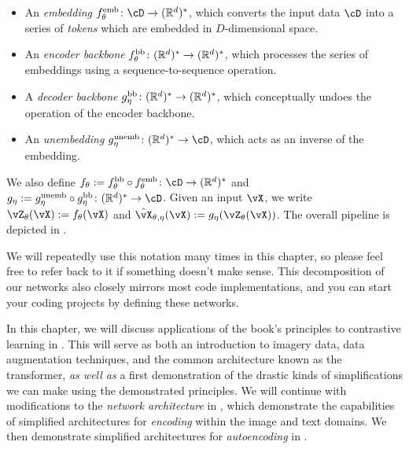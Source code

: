 \documentclass[../../book-main.tex]{subfiles}
\begin{document}
\begin{itemize}
    \begin{itemize}
        \item An \textit{embedding} \(f_{\theta}^{\emb} \colon \cD \to (\R^{d})^{*}\), which converts the input data \(\cD\) into a series of \textit{tokens} which are embedded in \(D\)-dimensional space.
        \item An \textit{encoder backbone} \(f_{\theta}^{\mathrm{bb}} \colon (\mathbb{R}^{d})^{*} \to (\mathbb{R}^{d})^{*}\), which processes the series of embeddings using a sequence-to-sequence operation.
        \item A \textit{decoder backbone} \(g_{\eta}^{\mathrm{bb}} \colon (\mathbb{R}^{d})^{*} \to (\mathbb{R}^{d})^{*}\), which conceptually undoes the operation of the encoder backbone.
        \item An \textit{unembedding} \(g_{\eta}^{\unemb} \colon (\R^{d})^{*} \to \cD\), which acts as an inverse of the embedding.
    \end{itemize}
    We also define \(f_{\theta} := f_{\theta}^{\backbone} \circ f_{\theta}^{\emb} \colon \cD \to (\R^{d})^{*}\) and \(g_{\eta} := g_{\eta}^{\unemb} \circ g_{\eta}^{\backbone} \colon (\R^{d})^{*} \to \cD\). Given an input \(\vX\), we write \(\vZ_{\theta}(\vX) := f_{\theta}(\vX)\) and \(\hat{\vX}_{\theta, \eta}(\vX) := g_{\eta}(\vZ_{\theta}(\vX))\). The overall pipeline is depicted in .
\end{itemize}

We will repeatedly use this notation many times in this chapter, so please feel free to refer back to it if something doesn't make sense. This decomposition of our networks also closely mirrors most code implementations, and you can start your coding projects by defining these networks.

In this chapter, we will discuss applications of the book's principles to contrastive learning in . This will serve as both an introduction to imagery data, data augmentation techniques, and the common architecture known as the transformer, \textit{as well as} a first demonstration of the drastic kinds of simplifications we can make using the demonstrated principles. We will continue with modifications to the \textit{network architecture} in , which demonstrate the capabilities of simplified architectures for \textit{encoding} within the image and text domains. We then demonstrate simplified architectures for \textit{autoencoding} in . %
\end{document}
